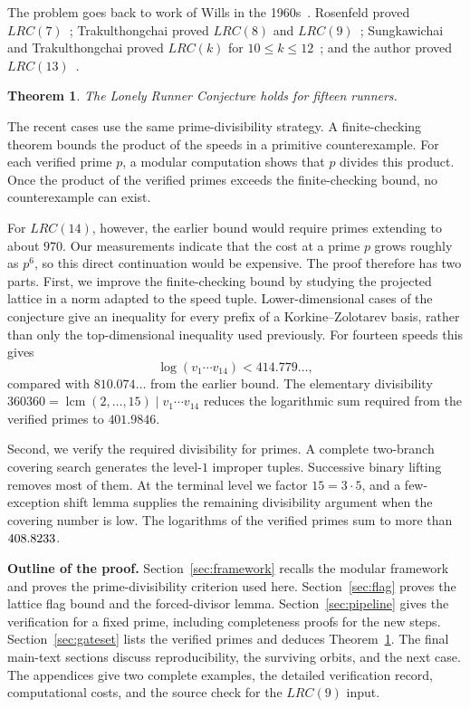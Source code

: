 \documentclass[11pt]{article}
\newtheorem{theorem}{Theorem}[section]
\theoremstyle{definition}
\theoremstyle{remark}
\DeclareMathOperator{\lcm}{lcm}
\newcommand{\TargetUB}{401.9846}          %
\begin{document}
The problem goes back to work of Wills in the 1960s~\cite{Wills1967}.
Rosenfeld proved $LRC(7)$~\cite{Rosenfeld25}; Trakulthongchai proved
$LRC(8)$ and $LRC(9)$~\cite{Trakulthongchai26}; Sungkawichai and
Trakulthongchai proved $LRC(k)$ for $10\leq k\leq12$~\cite{ST26}; and the
author proved $LRC(13)$~\cite{Allikvere26}.

\begin{theorem}\label{thm:main}
The Lonely Runner Conjecture holds for fifteen runners.
\end{theorem}

The recent cases use the same prime-divisibility strategy.  A
finite-checking theorem bounds the product of the speeds in a primitive
counterexample.  For each verified prime $p$, a modular computation shows
that $p$ divides this product.  Once the product of the verified primes
exceeds the finite-checking bound, no counterexample can exist.

For $LRC(14)$, however, the earlier bound would require primes extending to
about $970$.  Our measurements indicate that the cost at a prime $p$ grows
roughly as $p^6$, so this direct continuation would be expensive.  The
proof therefore has two parts.  First, we improve the finite-checking bound
by studying the projected lattice in a norm adapted to the speed tuple.
Lower-dimensional cases of the conjecture give an inequality for every
prefix of a Korkine--Zolotarev basis, rather than only the top-dimensional
inequality used previously.  For fourteen speeds this gives
\[
  \log(v_1\cdots v_{14})<414.779\ldots,
\]
compared with $810.074\ldots$ from the earlier bound.  The elementary
divisibility $360360=\lcm(2,\ldots,15)\mid v_1\cdots v_{14}$ reduces the
logarithmic sum required from the verified primes to $\TargetUB$.

Second, we verify the required divisibility for \GateCount{} primes.  A
complete two-branch covering search generates the level-$1$ improper
tuples.  Successive binary lifting removes most of them.  At the terminal
level we factor $15=3\cdot5$, and a few-exception shift lemma supplies the
remaining divisibility argument when the covering number is low.  The logarithms of
the verified primes sum to more than $408.8233$.

\medskip
\noindent\textbf{Outline of the proof.}
Section~\ref{sec:framework} recalls the modular framework and proves the
prime-divisibility criterion used here.  Section~\ref{sec:flag} proves the
lattice flag bound and the forced-divisor lemma.  Section~\ref{sec:pipeline}
gives the verification for a fixed prime, including completeness proofs for
the new steps.  Section~\ref{sec:gateset} lists the verified primes and
deduces Theorem~\ref{thm:main}.  The final main-text sections discuss
reproducibility, the surviving orbits, and the next case.  The appendices
give two complete examples, the detailed verification record,
computational costs, and the source check for the $LRC(9)$ input.
\end{document}
